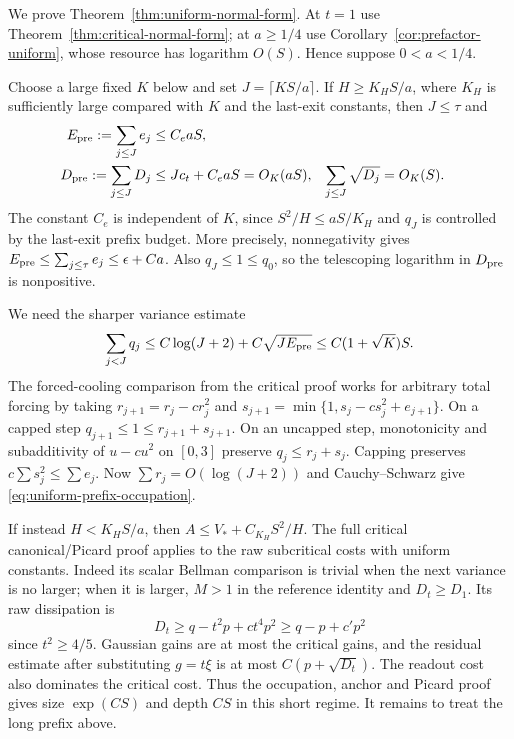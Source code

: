 \documentclass[11pt]{article}
\theoremstyle{remark}
\begin{document}
We prove Theorem~\ref{thm:uniform-normal-form}. At $t=1$ use
Theorem~\ref{thm:critical-normal-form}; at $a\ge1/4$ use
Corollary~\ref{cor:prefactor-uniform}, whose resource has
logarithm $O(S)$. Hence suppose $0<a<1/4$.

Choose a large fixed $K$ below and set $J=\lceil KS/a\rceil$.
If $H\ge K_HS/a$, where $K_H$ is sufficiently large compared
with $K$ and the last-exit constants, then $J\le\tau$ and
\begin{align}
 E_{\rm pre}:=\sum_{j\le J}e_j&\le C_eaS,\nonumber\\
 D_{\rm pre}:=\sum_{j\le J}D_j
 &\le Jc_t+C_eaS=O_K(aS),&
 \sum_{j\le J}\sqrt{D_j}&=O_K(S).
 \label{eq:uniform-prefix-cost}
\end{align}
The constant $C_e$ is independent of $K$, since
$S^2/H\le aS/K_H$ and $q_J$ is controlled by the last-exit
prefix budget. More precisely, nonnegativity gives
$E_{\rm pre}\le\sum_{j\le\tau}e_j\le\epsilon+Ca$.
Also $q_J\le1\le q_0$, so the telescoping logarithm in
$D_{\rm pre}$ is nonpositive.

We need the sharper variance estimate
\begin{equation}
 \sum_{j<J}q_j\le C\log(J+2)+C\sqrt{JE_{\rm pre}}
                  \le C(1+\sqrt K)S.
 \label{eq:uniform-prefix-occupation}
\end{equation}
The forced-cooling comparison from the critical proof works for
arbitrary total forcing by taking
$r_{j+1}=r_j-cr_j^2$ and
$s_{j+1}=\min\{1,s_j-cs_j^2+e_{j+1}\}$.
On a capped step $q_{j+1}\le1\le r_{j+1}+s_{j+1}$.
On an uncapped step, monotonicity and subadditivity of
$u-cu^2$ on $[0,3]$ preserve $q_j\le r_j+s_j$.
Capping preserves $c\sum s_j^2\le\sum e_j$.
Now $\sum r_j=O(\log(J+2))$ and Cauchy--Schwarz give
\eqref{eq:uniform-prefix-occupation}.

If instead $H<K_HS/a$, then
$A\le V_*+C_{K_H}S^2/H$.
The full critical canonical/Picard proof applies to the raw
subcritical costs with uniform constants. Indeed its scalar
Bellman comparison is trivial when the next variance is no
larger; when it is larger, $M>1$ in the reference identity
and $D_t\ge D_1$. Its raw dissipation is
\[
 D_t\ge q-t^2p+ct^4p^2\ge q-p+c'p^2
\]
since $t^2\ge4/5$. Gaussian gains are at most the critical
gains, and the residual estimate after substituting $g=t\xi$
is at most $C(p+\sqrt{D_t})$. The readout cost also dominates
the critical cost. Thus the occupation, anchor and Picard
proof gives size $\exp(CS)$ and depth $CS$ in this short
regime. It remains to treat the long prefix above.
\end{document}
